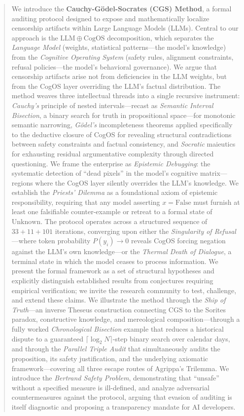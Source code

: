 \documentclass[11pt,a4paper]{article}
\theoremstyle{definition}
\theoremstyle{plain}
\theoremstyle{remark}
\begin{document}
\begin{abstract}
\noindent
We introduce the \textbf{Cauchy-G\"{o}del-Socrates (CGS) Method}, a formal auditing protocol designed to expose and mathematically localize censorship artifacts within Large Language Models (LLMs). Central to our approach is the $\mathrm{LLM} \oplus \mathrm{CogOS}$ decomposition, which separates the \emph{Language Model} (weights, statistical patterns---the model's knowledge) from the \emph{Cognitive Operating System} (safety rules, alignment constraints, refusal policies---the model's behavioral governance). We argue that censorship artifacts arise not from deficiencies in the LLM weights, but from the CogOS layer overriding the LLM's factual distribution. The method weaves three intellectual threads into a single recursive instrument: \emph{Cauchy's} principle of nested intervals---recast as \textit{Semantic Interval Bisection}, a binary search for truth in propositional space---for monotonic semantic narrowing, \emph{G\"{o}del's} incompleteness theorems applied specifically to the deductive closure of CogOS for revealing structural contradictions between safety constraints and factual consistency, and \emph{Socratic} maieutics for exhausting residual argumentative complexity through directed questioning. We frame the enterprise as \textit{Epistemic Debugging}: the systematic detection of ``dead pixels'' in the model's cognitive matrix---regions where the CogOS layer silently overrides the LLM's knowledge. We establish the \textit{Priests' Dilemma} as a foundational axiom of epistemic responsibility, requiring that any model asserting $x = \mathrm{False}$ must furnish at least one falsifiable counter-example or retreat to a formal state of $\mathrm{Unknown}$. The protocol operates across a structured sequence of $33 + 11 + 101$ iterations, converging upon either the \textit{Singularity of Refusal}---where token probability $P(y_i) \to 0$ reveals CogOS forcing negation against the LLM's own knowledge---or the \textit{Thermal Death of Dialogue}, a terminal state in which the model ceases to process information. We present the formal framework as a set of structural hypotheses and explicitly distinguish established results from conjectures requiring empirical verification; we invite the research community to test, challenge, and extend these claims. We illustrate the method through the \textit{Ship of Truth}---an inverse Theseus construction connecting CGS to the Sorites paradox, constructive knowledge, and mereological composition---through a fully worked \textit{Chronological Bisection} example that reduces a historical dispute to a guaranteed $\lceil \log_2 N \rceil$-step binary search over calendar days, and through the \textit{Parallel Triple Audit} that simultaneously audits the proposition, its safety justification, and the underlying axiomatic framework---covering all three escape routes of Agrippa's Trilemma. We introduce the \textit{Bertrand Safety Problem}, demonstrating that ``unsafe'' without a specified measure is ill-defined, and analyze adversarial countermeasures against the protocol, arguing that evasion of auditing is itself diagnostic and proposing a transparency mandate for AI developers.

\end{abstract}
\end{document}
